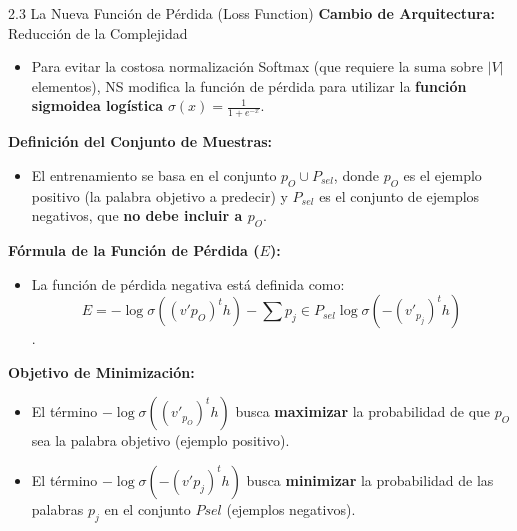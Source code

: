 \documentclass{beamer}
\begin{document}
	
	
\begin{frame}{2.3  La Nueva Función de Pérdida (Loss Function)}
	\textbf{Cambio de Arquitectura:} Reducción de la Complejidad\\
	\begin{itemize}
		\item Para evitar la costosa normalización Softmax (que requiere la suma sobre $|V|$ elementos), NS modifica la función de pérdida para utilizar la \textbf{función sigmoidea logística} $\sigma(x) = \frac{1}{1 + e^{-x}}$.
	\end{itemize}
	
	\textbf{Definición del Conjunto de Muestras:}\\
	\begin{itemize}
		\item El entrenamiento se basa en el conjunto ${p_O} \cup P_{sel}$, donde $p_O$ es el ejemplo positivo (la palabra objetivo a predecir) y $P_{sel}$ es el conjunto de ejemplos negativos, que \textbf{no debe incluir a $p_O$}.	
	\end{itemize}
	\textbf{Fórmula de la Función de Pérdida ($E$):}\\
	\begin{itemize}
		\item La función de pérdida negativa está definida como: $$ E = -\log \sigma((v'{p_O})^t h) - \sum{p_j \in P_{sel}} \log \sigma(-(v'_{p_j})^t h) $$.	
	\end{itemize}
	\textbf{Objetivo de Minimización:}\\
	\begin{itemize}
		\item El término $-\log \sigma((v'_{p_O})^t h)$ busca \textbf{maximizar} la probabilidad de que $p_O$ sea la palabra objetivo (ejemplo positivo).
		\item El término $-\log \sigma(-(v'{p_j})^t h)$ busca \textbf{minimizar} la probabilidad de las palabras $p_j$ en el conjunto $P{sel}$ (ejemplos negativos).
	\end{itemize}
	
	
\end{frame}	
	
	
	
\end{document}
